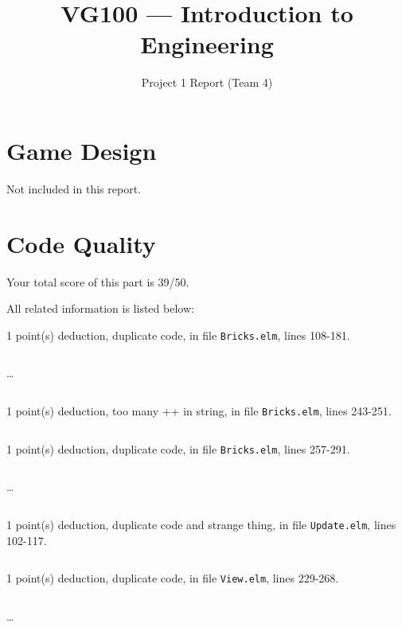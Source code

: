 \documentclass{article}
\title{VG100 --- Introduction to\\ Engineering}
\subtitle{Project 1 Report (Team 4)}
\begin{document}
\maketitle

\section{Game Design}

Not included in this report.

\section{Code Quality}

Your total score of this part is 39/50. \medskip

All related information is listed below: \medskip

1 point(s) {\color{red}deduction}, duplicate code, in file {\color{blue}\texttt{Bricks.elm}}, lines {\color{blue}108-181}.

\inputminted[firstline=108,lastline=117]{elm}{Bricks.elm}

\dots

\inputminted[firstline=172,lastline=181]{elm}{Bricks.elm}

1 point(s) {\color{red}deduction}, too many ++ in string, in file {\color{blue}\texttt{Bricks.elm}}, lines {\color{blue}243-251}.

\inputminted[firstline=243,lastline=251]{elm}{Bricks.elm}

1 point(s) {\color{red}deduction}, duplicate code, in file {\color{blue}\texttt{Bricks.elm}}, lines {\color{blue}257-291}.

\inputminted[firstline=257,lastline=266]{elm}{Bricks.elm}

\dots

\inputminted[firstline=282,lastline=291]{elm}{Bricks.elm}

1 point(s) {\color{red}deduction}, duplicate code and strange thing, in file {\color{blue}\texttt{Update.elm}}, lines {\color{blue}102-117}.

\inputminted[firstline=102,lastline=117]{elm}{Update.elm}

1 point(s) {\color{red}deduction}, duplicate code, in file {\color{blue}\texttt{View.elm}}, lines {\color{blue}229-268}.

\inputminted[firstline=229,lastline=238]{elm}{View.elm}

\dots

\inputminted[firstline=259,lastline=268]{elm}{View.elm}
\end{document}
